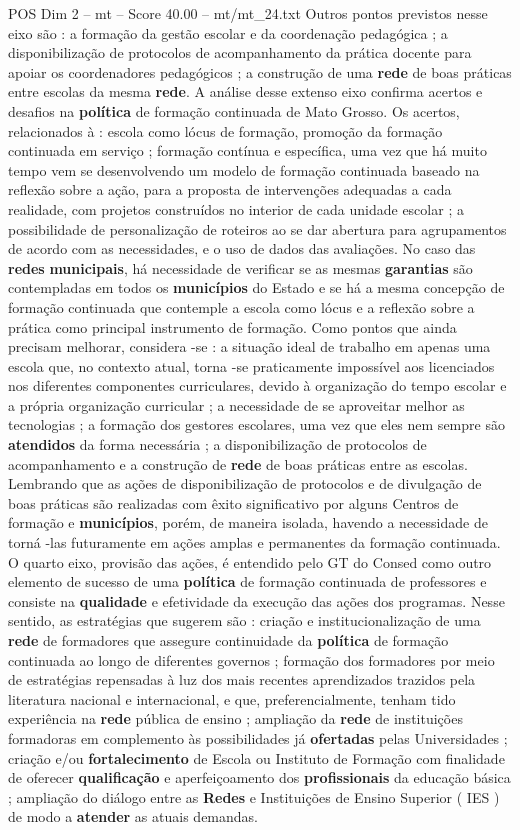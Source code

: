 \begin{textsample}{POS Dim 2 – mt – Score 40.00 – mt/mt\_24.txt}
Outros pontos previstos nesse eixo são : a formação da gestão escolar e da coordenação pedagógica ; a disponibilização de protocolos de acompanhamento da prática docente para apoiar os coordenadores pedagógicos ; a construção de uma \textbf{rede} de boas práticas entre escolas da mesma \textbf{rede}.
A análise desse extenso eixo confirma acertos e desafios na \textbf{política} de formação continuada de Mato Grosso.
Os acertos, relacionados à : escola como lócus de formação, promoção da formação continuada em serviço ; formação contínua e específica, uma vez que há muito tempo vem se desenvolvendo um modelo de formação continuada baseado na reflexão sobre a ação, para a proposta de intervenções adequadas a cada realidade, com projetos construídos no interior de cada unidade escolar ; a possibilidade de personalização de roteiros ao se dar abertura para agrupamentos de acordo com as necessidades, e o uso de dados das avaliações.
No caso das \textbf{redes} \textbf{municipais}, há necessidade de verificar se as mesmas \textbf{garantias} são contempladas em todos os \textbf{municípios} do Estado e se há a mesma concepção de formação continuada que contemple a escola como lócus e a reflexão sobre a prática como principal instrumento de formação.
Como pontos que ainda precisam melhorar, considera -se : a situação ideal de trabalho em apenas uma escola que, no contexto atual, torna -se praticamente impossível aos licenciados nos diferentes componentes curriculares, devido à organização do tempo escolar e a própria organização curricular ; a necessidade de se aproveitar melhor as tecnologias ; a formação dos gestores escolares, uma vez que eles nem sempre são \textbf{atendidos} da forma necessária ; a disponibilização de protocolos de acompanhamento e a construção de \textbf{rede} de boas práticas entre as escolas.
Lembrando que as ações de disponibilização de protocolos e de divulgação de boas práticas são realizadas com êxito significativo por alguns Centros de formação e \textbf{municípios}, porém, de maneira isolada, havendo a necessidade de torná -las futuramente em ações amplas e permanentes da formação continuada.
O quarto eixo, provisão das ações, é entendido pelo GT do Consed como outro elemento de sucesso de uma \textbf{política} de formação continuada de professores e consiste na \textbf{qualidade} e efetividade da execução das ações dos programas.
Nesse sentido, as estratégias que sugerem são : criação e institucionalização de uma \textbf{rede} de formadores que assegure continuidade da \textbf{política} de formação continuada ao longo de diferentes governos ; formação dos formadores por meio de estratégias repensadas à luz dos mais recentes aprendizados trazidos pela literatura nacional e internacional, e que, preferencialmente, tenham tido experiência na \textbf{rede} pública de ensino ; ampliação da \textbf{rede} de instituições formadoras em complemento às possibilidades já \textbf{ofertadas} pelas Universidades ; criação e/ou \textbf{fortalecimento} de Escola ou Instituto de Formação com finalidade de oferecer \textbf{qualificação} e aperfeiçoamento dos \textbf{profissionais} da educação básica ; ampliação do diálogo entre as \textbf{Redes} e Instituições de Ensino Superior ( IES ) de modo a \textbf{atender} as atuais demandas.

\end{textsample}
